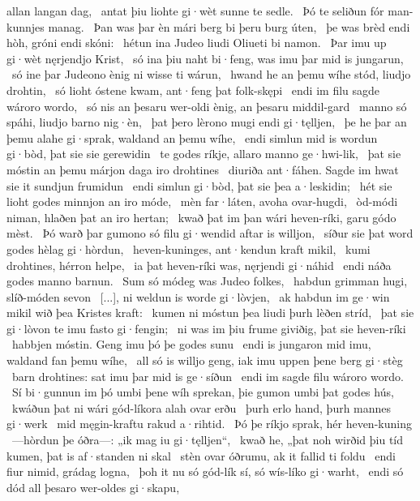 allan langan dag, \hld\ antat þiu liohte gi·wèt
sunne te sedle. \hld\ Þó te seliðun fór
man-kunnjes manag. \hld\ Þan was þar èn mári berg
bi þeru burg úten, \hld\ þe was brèd endi hòh,
gróni endi skóni: \hld\ hétun ina Judeo liudi
Oliueti bi namon. \hld\ Þar imu up gi·wèt
nęrjendjo Krist, \hld\ só ina þiu naht bi·feng,
was imu þar mid is jungarun, \hld\ só ine þar Judeono ènig
ni wisse ti wárun, \hld\ hwand he an þemu wíhe stód,
liudjo drohtin, \hld\ só lioht óstene kwam,
ant·feng þat folk-skępi \hld\ endi im filu sagde
wároro wordo, \hld\ só nis an þesaru wer-oldi ènig,
an þesaru middil-gard \hld\ manno só spáhi,
liudjo barno nig·èn, \hld\ þat þero lèrono mugi
endi gi·tęlljen, \hld\ þe he þar an þemu alahe gi·sprak,
waldand an þemu wíhe, \hld\ endi simlun mid is wordun gi·bòd,
þat sie sie gerewidin \hld\ te godes ríkje,
allaro manno ge·hwi-lik, \hld\ þat sie móstin an þemu márjon daga
iro drohtines \hld\ diuriða ant·fáhen.
Sagde im hwat sie it sundjun frumidun \hld\ endi simlun gi·bòd,
þat sie þea a·leskidin; \hld\ hét sie lioht godes
minnjon an iro móde, \hld\ mèn far·láten,
avoha ovar-hugdi, \hld\ òd-módi niman,
hlaðen þat an iro hertan; \hld\ kwað þat im þan wári heven-ríki,
garu gódo mèst. \hld\ Þó warð þar gumono só filu
gi·wendid aftar is willjon, \hld\ síður sie þat word godes
hèlag gi·hòrdun, \hld\ heven-kuninges,
ant·kendun kraft mikil, \hld\ kumi drohtines,
hérron helpe, \hld\ ia þat heven-ríki was,
nęrjendi gi·náhid \hld\ endi náða godes
manno barnun. \hld\ Sum só módeg was
Judeo folkes, \hld\ habdun grimman hugi,
slíð-móden sevon \hld\ [...],
ni weldun is worde gi·lòvjen, \hld\ ak habdun im ge·win mikil
wið þea Kristes kraft: \hld\ kumen ni móstun
þea liudi þurh lèðen stríd, \hld\ þat sie gi·lòvon te imu
fasto gi·fengin; \hld\ ni was im þiu frume giviðig,
þat sie heven-ríki \hld\ habbjen móstin.
Geng imu þó þe godes sunu \hld\ endi is jungaron mid imu,
waldand fan þemu wíhe, \hld\ all só is willjo geng,
iak imu uppen þene berg gi·stèg \hld\ barn drohtines:
sat imu þar mid is ge·síðun \hld\ endi im sagde filu
wároro wordo. \hld\ Sí bi·gunnun im þó umbi þene wíh sprekan,
þie gumon umbi þat godes hús, \hld\ kwáðun þat ni wári gód-líkora
alah ovar erðu \hld\ þurh erlo hand,
þurh mannes gi·werk \hld\ mid męgin-kraftu
rakud a·rihtid. \hld\ Þó þe ríkjo sprak,
hér heven-kuning \hld\ —hòrdun þe óðra—:
„ik mag iu gi·tęlljen“, \hld\ kwað he, „þat noh wirðid þiu tíd kumen,
þat is af·standen ni skal \hld\ stèn ovar óðrumu,
ak it fallid ti foldu \hld\ endi fiur nimid,
grádag logna, \hld\ þoh it nu só gód-lík sí,
só wís-líko gi·warht, \hld\ endi só dód all þesaro wer-oldes gi·skapu,
